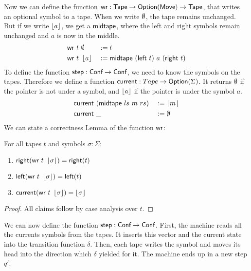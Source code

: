 
Now we can define the function $\textsf{wr} : \textsf{Tape} \rightarrow \textsf{Option}(\textsf{Move}) \rightarrow \textsf{Tape}$, that writes an optional symbol to a tape.  When we write $\emptyset$,
the tape remains unchanged.  But if we write $\left\lfloor {a}\right\rfloor$, we get a $\textsf{midtape}$, where the left and right symbols remain unchanged and $a$ is now in
the middle.
\begin{alignat*}{3}
  \textsf{wr}~t &~ \emptyset   &&:= t \\
  \textsf{wr}~t &~ \left\lfloor {a}\right\rfloor &&:= \textsf{midtape}~(\textsf{left}~t)~{a}~(\textsf{right}~t)
\end{alignat*}
To define the function $\textsf{step} : \textsf{Conf} \rightarrow \textsf{Conf}$, we need to know the symbols on the tapes.
Therefore we define a function $\textsf{current} : Tape \rightarrow \textsf{Option}(\Sigma)$.
It returns $\emptyset$ if the pointer is not under a symbol, and $\left\lfloor {a}\right\rfloor$ if the pointer is under the symbol $a$.
\begin{alignat*}{2}
  \textsf{current}&~(\textsf{midtape}~{ls}~{m}~{rs})&&:= \left\lfloor {m}\right\rfloor \\
  \textsf{current}&~\_                          &&:= \emptyset
\end{alignat*}
We can state a correctness Lemma of the function $\MS{wr}$:
\begin{lemma}[Correctness of $\MS{wr}$]
  \label{lem:write}
  For all tapes $t$ and symbols $\sigma:\Sigma$:
  \begin{enumerate}
  \item $\textsf{right}   (\textsf{wr}~t~\left\lfloor {\sigma}\right\rfloor) = \textsf{right}(t)$
  \item $\textsf{left}    (\textsf{wr}~t~\left\lfloor {\sigma}\right\rfloor) = \textsf{left} (t)$
  \item $\textsf{current} (\textsf{wr}~t~\left\lfloor {\sigma}\right\rfloor) = \left\lfloor {\sigma}\right\rfloor$
  \end{enumerate}
\end{lemma}
\begin{proof}
  All claims follow by case analysis over $t$.
\end{proof}

We can now define the function $\textsf{step} : \textsf{Conf} \rightarrow \textsf{Conf}$.  First, the machine reads all the currents symbols from the tapes.  It
inserts this vector and the current state into the transition function $\delta$.  Then, each tape writes the symbol and moves its head into the
direction which $\delta$ yielded for it.  The machine ends up in a new step $q'$.

